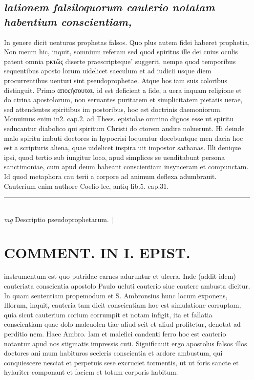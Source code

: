 \documentclass{article}
\begin{document}
\begin{pages}
\subsection*{\textit{lationem falsiloquorum cauterio notatam habentium conscientiam, }}\pstart In genere dicit uenturos prophetas falsos. Quo plus autem fidei haberet prophetia, Non meum hic, inquit, somnium referam sed quod spiritus ille dei cuius oculis patent omnia pκτῶς diserte praescripteque ́ suggerit, nempe quod temporibus sequentibus aposto lorum uidelicet saeculum et ad iudicii usque diem procurrentibus uenturi sint pseudoprophetae. Atque hos iam suis coloribus distinguit. Primo αποςήσουται, id est deficient a fide, a uera inquam religione et do ctrina apostolorum, non seruantes puritatem et simplicitatem pietatis uerae, sed attendentes spiritibus im postoribus, hoc est doctrinis daemoniorum. Monuimus enim in2. cap.2. ad Thess. epistolae omnino dignos esse ut spiritu seducantur diabolico qui spiritum Christi do ctorem audire noluerunt. Hi deinde malo spiritu imbuti doctores in hypocrisi loquentur docebuntque men dacia hoc est a scripturis aliena, quae uidelicet inspira uit impostor sathanas. Illi denique ipsi, quod tertio sub iungitur loco, apud simplices se uenditabunt persona sanctimoniae, cum apud deum habeant conscientiam insynceram et compunctam. Id quod metaphora cau terii a corpore ad animum deflexa adumbrauit. Cauterium enim authore Coelio lec, antiq lib.5. cap.31.  \pend
\vspace{0.5cm}\noindent
\vspace{0.2cm}\rule{1cm}{0.2pt}\\ 
\hspace{0.2cm}\textit{mg}
\footnotesize Descriptio pseudoprophetarum. 
\normalsize| 
\section*{COMMENT. IN I. EPIST. }\pstart instrumentum est quo putridae carnes aduruntur et ulcera. Inde (addit idem) cauteriata conscientia apostolo Paulo ueluti cauterio siue cautere ambusta dicitur. In quam sententiam propemodum et S. Ambronsius hunc locum exponens, Illorum, inquit, cauteria tam dicit conscientiam hoc est simulatione corruptam, quia sicut cauterium corium corrumpit et notam infigit, ita et fallatia conscientiam quae dolo maleuolen tiae aliud scit et aliud profitetur, denotat ad perditio nem. Haec Ambro. Iam et malefici candenti ferro hoc est cauterio notantur apud nos stigmatis impressis cuti. Significauit ergo apostolus falsos illos doctores ani mum habituros sceleris conscientia et ardore ambustum, qui conquiescere nesciat et perpetuis sese excruciet tormentis, ut ut foris sancte et hylariter componant et faciem et totum corporis habitum.  \pend
{}
{}

\end{pages}
\end{document}
